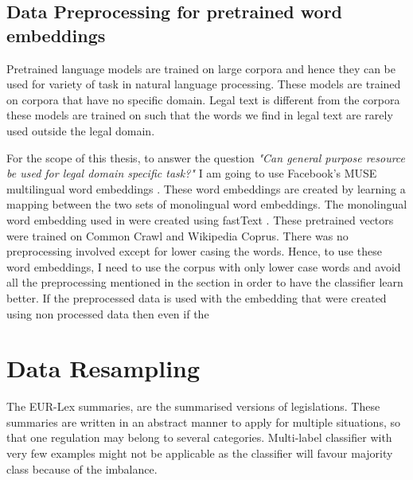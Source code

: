 \subsection{Data Preprocessing for pretrained word embeddings}
Pretrained language models are trained on large corpora and hence they can be used for variety of task in natural language processing. These models are trained on corpora that have no specific domain. Legal text is different from the corpora these models are trained on such that the words we find in legal text are rarely used outside the legal domain. 

For the scope of this thesis, to answer the question \textit{"Can general purpose resource be used for legal domain specific task?"} I am going to use Facebook's MUSE multilingual word embeddings \cite{conneau2017word}. These word embeddings are created by learning a mapping between the two sets of monolingual word embeddings. The monolingual word embedding used in were created using fastText \cite{bojanowski2017enriching}. These pretrained vectors were trained on Common Crawl and Wikipedia Coprus. There was no preprocessing involved except for lower casing the words. Hence, to use these word embeddings, I need to use the corpus with only lower case words and avoid all the preprocessing mentioned in the section in order to have the classifier learn better. If the preprocessed data is used with the embedding that were created using non processed data then even if the 


\section{Data Resampling} \label{dataResampling}
The EUR-Lex summaries, are the summarised versions of legislations. These summaries are written in an abstract manner to apply for multiple situations, so that one regulation may belong to several categories. Multi-label classifier with very few examples might not be applicable as the classifier will favour majority class because of the imbalance. 

